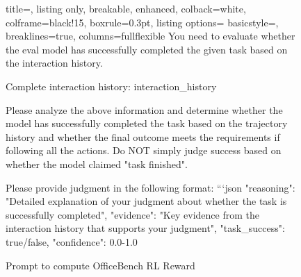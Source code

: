 \begin{figure}[htbp]
    \centering
\begin{tcolorbox}[title=Prompt to compute OfficeBench RL Reward]
\begin{tcblisting}{
  title=,
  listing only,
  breakable,
  enhanced,
  colback=white,
  colframe=black!15,
  boxrule=0.3pt,
  listing options={
    basicstyle=\ttfamily\scriptsize, %
    breaklines=true,
    columns=fullflexible
  }
}
You need to evaluate whether the eval model has successfully completed the given task based on the interaction history.

Complete interaction history:
{interaction_history}

Please analyze the above information and determine whether the model has successfully completed the task based on the trajectory history and whether the final outcome meets the requirements if following all the actions. Do NOT simply judge success based on whether the model claimed "task finished". 

Please provide judgment in the following format:
```json
{{
    "reasoning": "Detailed explanation of your judgment about whether the task is successfully completed",
    "evidence": "Key evidence from the interaction history that supports your judgment",
    "task_success": true/false,
    "confidence": 0.0-1.0
}}
\end{tcblisting}
\end{tcolorbox}
\caption{Prompt to compute OfficeBench RL Reward}
\label{fig:Prompt to compute OfficeBench RL Reward}
\end{figure}




